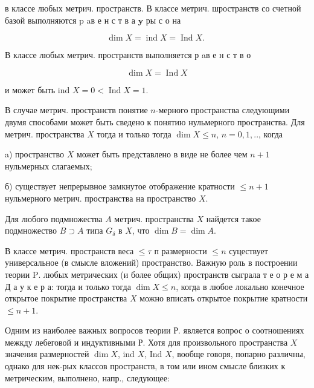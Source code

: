 \documentclass[10pt]{article}
\begin{document}
в классе любых метрич. пространств. В классе метрич. шространств со счетной базой выполняются $\mathrm{p}$ aв е н с т в а $\mathbf{y}$ ры с о на



\[

\operatorname{dim} X=\operatorname{ind} X=\operatorname{Ind} X \text {. }

\]



В классе любых метрич. пространств выполняется р aв е н с т в о



\[

\operatorname{dim} X=\operatorname{Ind} X

\]



и может быть ind $X=0<\operatorname{Ind} X=1$.



В случае метрич. пространств понятие $n$-мерного пространства следующими двумя способами может быть сведено к понятию нульмерного пространства. Для метрич. пространства $X$ тогда и только тогда $\operatorname{dim} X \leqslant n$, $n=0,1, . .$, когда



a) пространство $X$ может быть представлено в виде не более чем $n+1$ нульмерных слагаемых;



б) существует непрерывное замкнутое отображение кратности $\leqslant n+1$ нульмерного метрич. пространства на пространство $X$.



Для любого подмножества $A$ метрич. пространства $X$ найдется такое подмножество $B \supset A$ типа $G_{\delta}$ в $X$, что $\operatorname{dim} B=\operatorname{dim} A$.



В классе метрич. пространств веса $\leqslant \tau$ п размерности $\leqslant n$ суцествует универсальное (в смысле вложений) пространство. Важную роль в построении теории $\mathrm{P}$. любых метрических (и более общих) пространств сыграла т е о р е м а Д а у к е р а: тогда и только тогда $\operatorname{dim} X \leqslant n$, когда в любое локально конечное открытое покрытие пространства $X$ можно вписать открытое покрытие кратности $\leqslant n+1$.



Одним из наиболее важных вопросов теории Р. является вопрос о соотношениях межкду лебеговой и индуктивными Р. Хотя для произвольного пространства $X$ значения размерностей $\operatorname{dim} X$, ind $X$, Ind $X$, вообще говоря, попарно различны, однако для нек-рых классов пространств, в том или ином смысле близких к метрическим, выполнено, напр., следующее:
\end{document}
